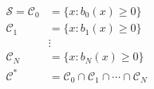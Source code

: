 \documentclass[preview]{standalone}
\begin{document}
\begin{align*}
\mathcal{S} = \mathcal{C}_0 &= \{x : b_0(x) \geq 0\}\\ \mathcal{C}_1 &= \{x : b_1(x) \geq 0\}\\ &\vdots\\ \mathcal{C}_N &= \{x : b_N(x) \geq 0\}\\ \mathcal{C}^* &= \mathcal{C}_0 \cap \mathcal{C}_1 \cap \cdots \cap \mathcal{C}_N
\end{align*}
\end{document}
